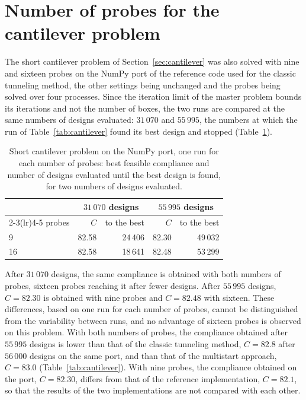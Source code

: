 \documentclass[pdflatex,sn-basic]{sn-jnl}
\newenvironment{appendices}{\appendix}{}
\begin{document}
\begin{appendices}
\section{Number of probes for the cantilever problem}\label{app:probes}

The short cantilever problem of Section~\ref{sec:cantilever} was also solved with
nine and sixteen probes on the NumPy port of the reference code used for the
classic tunneling method, the other settings being unchanged and the probes
being solved over four processes. Since the iteration limit of the master
problem bounds its iterations and not the number of boxes, the two runs are
compared at the same numbers of designs evaluated: $31\,070$ and $55\,995$, the
numbers at which the run of Table~\ref{tab:cantilever} found its best design
and stopped (Table~\ref{tab:probes}).

\begin{table}[h]
  \centering
  \caption{Short cantilever problem on the NumPy port, one run for each number
    of probes: best feasible compliance and number of designs evaluated until
    the best design is found, for two numbers of designs evaluated.}
  \label{tab:probes}
  \small
  \begin{tabular}{lrrrr}
    \toprule
    & \multicolumn{2}{c}{$31\,070$ designs} & \multicolumn{2}{c}{$55\,995$ designs} \\
    \cmidrule(lr){2-3}\cmidrule(lr){4-5}
    probes & $C$ & to the best & $C$ & to the best \\
    \midrule
    9  & 82.58 & 24\,406 & 82.30 & 49\,032 \\
    16 & 82.58 & 18\,641 & 82.48 & 53\,299 \\
    \bottomrule
  \end{tabular}
\end{table}

After $31\,070$ designs, the same compliance is obtained with both numbers of
probes, sixteen probes reaching it after fewer designs. After $55\,995$ designs,
$C = 82.30$ is obtained with nine probes and $C = 82.48$ with sixteen. These
differences, based on one run for each number of probes, cannot be distinguished
from the variability between runs, and no advantage of sixteen probes is
observed on this problem. With both numbers of probes, the compliance obtained
after $55\,995$ designs is lower than that of the classic tunneling method,
$C = 82.8$ after $56\,000$ designs on the same port, and than that of the
multistart approach, $C = 83.0$ (Table~\ref{tab:cantilever}). With nine probes, the compliance obtained on the port,
$C = 82.30$, differs from that of the reference implementation,
$C = 82.1$, so that the results of the two implementations are not compared with
each other.

\end{appendices}


\end{document}
